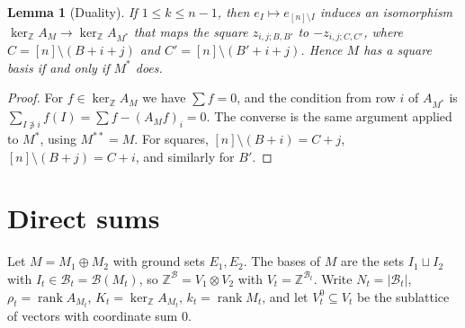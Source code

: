 \documentclass[11pt,a4paper]{article}
\theoremstyle{plain}
\newtheorem{lemma}[theorem]{Lemma}
\theoremstyle{definition}
\newcommand{\Z}{\mathbb Z}
\newcommand{\AM}{A_M}
\newcommand{\kerZ}{\ker_{\Z}\!A_M}
\newcommand{\bs}{\mathcal B}
\newcommand{\rank}{\operatorname{rank}}
\begin{document}
\begin{lemma}[Duality]\label{lem:dual}
If $1\le k\le n-1$, then $e_I\mapsto e_{[n]\setminus I}$ induces an isomorphism $\kerZ\to\ker_\Z A_{M^*}$ that maps the square $z_{i,j;B,B'}$ to $-z_{i,j;C,C'}$, where $C=[n]\setminus(B+i+j)$ and $C'=[n]\setminus(B'+i+j)$. Hence $M$ has a square basis if and only if $M^*$ does.
\end{lemma}
\begin{proof}
For $f\in\kerZ$ we have $\sum f=0$, and the condition from row $i$ of $A_{M^*}$ is $\sum_{I\not\ni i}f(I)=\sum f-(\AM f)_i=0$. The converse is the same argument applied to $M^{*}$, using $M^{**}=M$. For squares, $[n]\setminus(B+i)=C+j$, $[n]\setminus(B+j)=C+i$, and similarly for $B'$.
\end{proof}

\section{Direct sums}\label{sec:dsum}
Let $M=M_1\oplus M_2$ with ground sets $E_1,E_2$. The bases of $M$ are the sets $I_1\sqcup I_2$ with $I_t\in\bs_t=\bs(M_t)$, so $\Z^{\bs}=V_1\otimes V_2$ with $V_t=\Z^{\bs_t}$. Write $N_t=|\bs_t|$, $\rho_t=\rank A_{M_t}$, $K_t=\ker_\Z A_{M_t}$, $k_t=\rank M_t$, and let $V_t^0\subseteq V_t$ be the sublattice of vectors with coordinate sum $0$.
\end{document}

